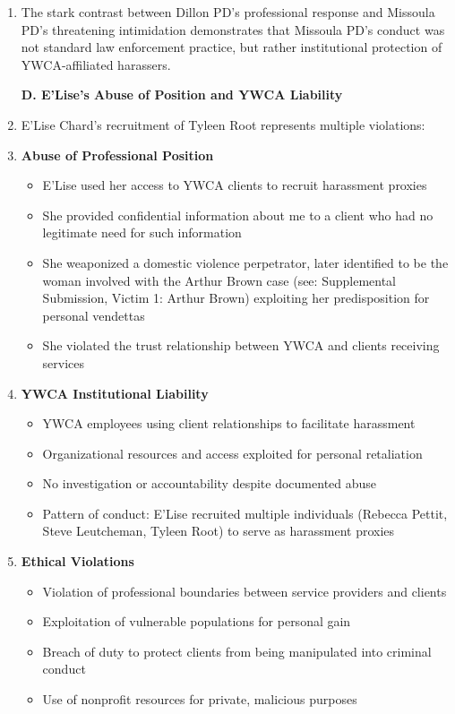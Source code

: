 \documentclass[12pt,letterpaper]{article}
\begin{document}
\begin{enumerate}
\item The stark contrast between Dillon PD's professional response and Missoula PD's threatening intimidation demonstrates that Missoula PD's conduct was not standard law enforcement practice, but rather institutional protection of YWCA-affiliated harassers.

\textbf{D. E'Lise's Abuse of Position and YWCA Liability}

\item E'Lise Chard's recruitment of Tyleen Root represents multiple violations:

\item \textbf{Abuse of Professional Position}

\begin{itemize}
\item E'Lise used her access to YWCA clients to recruit harassment proxies
\item She provided confidential information about me to a client who had no legitimate need for such information
\item She weaponized a domestic violence perpetrator, later identified to be the woman involved with the Arthur Brown case (see: Supplemental Submission, Victim 1: Arthur Brown) exploiting her predisposition for personal vendettas
\item She violated the trust relationship between YWCA and clients receiving services
\end{itemize}

\item \textbf{YWCA Institutional Liability}

\begin{itemize}
\item YWCA employees using client relationships to facilitate harassment
\item Organizational resources and access exploited for personal retaliation
\item No investigation or accountability despite documented abuse
\item Pattern of conduct: E'Lise recruited multiple individuals (Rebecca Pettit, Steve Leutcheman, Tyleen Root) to serve as harassment proxies
\end{itemize}

\item \textbf{Ethical Violations}

\begin{itemize}
\item Violation of professional boundaries between service providers and clients
\item Exploitation of vulnerable populations for personal gain
\item Breach of duty to protect clients from being manipulated into criminal conduct
\item Use of nonprofit resources for private, malicious purposes
\end{itemize}


\end{enumerate}
\end{document}
